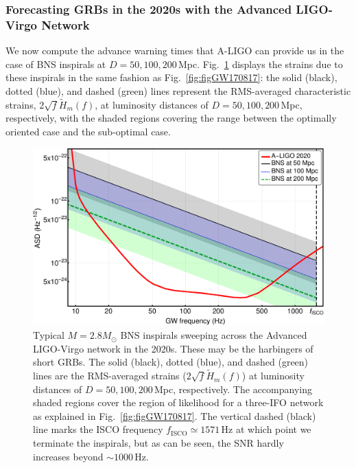 \documentclass[amsmath,amssymb,aps,floats,amsfonts,notitlepage,superscriptaddress,eqsecnum,nofootinbib,10pt]{revtex4-1}
\begin{document}
\subsubsection{Forecasting GRBs in the 2020s with the Advanced LIGO-Virgo Network}\label{Sec:ALIGO2020}
We now compute the advance warning times that A-LIGO can provide us in the case of BNS inspirals at $D=50, 100,200\,$Mpc.
Fig.~\ref{fig:LIGO2020} displays the strains due to these inspirals in the same fashion as
Fig.~\ref{fig:figGW170817}: the solid (black), dotted (blue), and dashed (green) lines represent the RMS-averaged characteristic strains, $2\sqrt{f}\tilde{H}_m(f)$, at luminosity distances of $D=50, 100, 200\,$Mpc, respectively, with the shaded regions covering the range
between the optimally oriented case and the sub-optimal case.
%
%
\begin{figure}[h!]
\includegraphics[width=\linewidth]{../Figures/ALigo_strains.pdf}
\caption{Typical $M=2.8 M_\odot$ BNS inspirals sweeping across the Advanced LIGO-Virgo network in the 2020s.
These may be the harbingers of short GRBs.
The solid (black), dotted (blue), and dashed (green) lines are the RMS-averaged strains ($2\sqrt{f}\tilde{H}_m(f)$) at luminosity distances of $D=50, 100, 200\,$Mpc, respectively. The accompanying shaded regions cover the region of likelihood for a three-IFO network as explained in Fig.~\ref{fig:figGW170817}.
The vertical dashed (black) line marks the ISCO frequency $f_\text{ISCO} \simeq 1571\,$Hz at which point we terminate the inspirals,
but as can be seen, the SNR hardly increases beyond $\sim 1000\,$Hz.
}
\label{fig:LIGO2020}
\end{figure}
%
%
\end{document}
